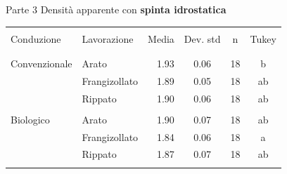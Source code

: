 \documentclass[xcolor={usenames, table, x11names}, final, 10pt]{beamer}
\begin{document}
\begin{frame}{Parte 3 \small{Densità apparente con \bf{\large{spinta idrostatica}}}}

  \footnotesize
  \begin{table}[ht]
    \centering
    \begin{tabular}{llrccc}
      \toprule
      \\
      Conduzione    & Lavorazione   & Media& Dev. std & n    & Tukey \\ 
      \\
      \midrule
      \\
      Convenzionale & Arato         & 1.93 & 0.06      &  18 & b     \\ 
                    & Frangizollato & 1.89 & 0.05      &  18 & ab    \\ 
                    & Rippato       & 1.90 & 0.06      &  18 & ab    \\
      \\
      Biologico     & Arato         & 1.90 & 0.07      &  18 & ab    \\ 
                    & Frangizollato & 1.84 & 0.06      &  18 & a     \\ 
                    & Rippato       & 1.87 & 0.07      &  18 & ab    \\ 
      \\
      \bottomrule
    \end{tabular}
    \label{tab:RiassuntoDensitaSpinta}
  \end{table}
\end{frame}
\end{document}
